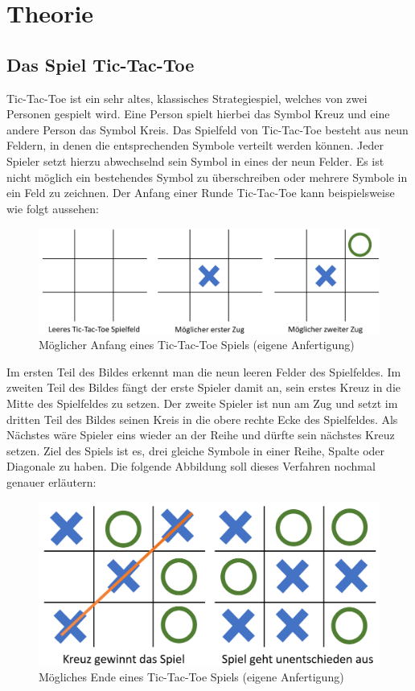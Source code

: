 \chapter{Theorie}
\section{Das Spiel Tic-Tac-Toe}

Tic-Tac-Toe ist ein sehr altes, klassisches Strategiespiel, welches von zwei Personen gespielt wird. Eine Person
spielt hierbei das Symbol Kreuz und eine andere Person das Symbol Kreis. Das Spielfeld von Tic-Tac-Toe besteht aus
neun Feldern, in denen die entsprechenden Symbole verteilt werden können. Jeder Spieler setzt hierzu abwechselnd sein
Symbol in eines der neun Felder. Es ist nicht möglich ein bestehendes Symbol zu überschreiben oder mehrere Symbole in
ein Feld zu zeichnen. Der Anfang einer Runde Tic-Tac-Toe kann beispielsweise wie folgt aussehen:
\begin{figure}[H]
    \centering
    \includegraphics[scale=0.25]{img/tictactoe_start.png}
    \caption[Möglicher Anfang eines Tic-Tac-Toe Spiels]{Möglicher Anfang eines Tic-Tac-Toe Spiels (eigene Anfertigung)}
    \label{fig:tictactoestates}
\end{figure}
Im ersten Teil des Bildes erkennt man die neun leeren Felder des Spielfeldes. Im zweiten Teil des Bildes fängt der erste
Spieler damit an, sein erstes Kreuz in die Mitte des Spielfeldes zu setzen. Der zweite Spieler ist nun am Zug und setzt
im dritten Teil des Bildes seinen Kreis in die obere rechte Ecke des Spielfeldes. Als Nächstes wäre Spieler eins wieder an
der Reihe und dürfte sein nächstes Kreuz setzen. Ziel des Spiels ist es, drei gleiche Symbole in einer Reihe, Spalte oder
Diagonale zu haben. Die folgende Abbildung soll dieses Verfahren nochmal genauer erläutern:
\begin{figure}[H]
    \centering
    \includegraphics[scale=0.25]{img/tictactoe_endings.png} 
    \caption[Mögliches Ende eines Tic-Tac-Toe Spiels]{Mögliches Ende eines Tic-Tac-Toe Spiels (eigene Anfertigung)}
\end{figure}
